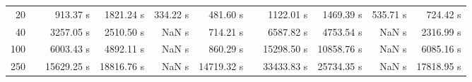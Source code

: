 {\begin{table}[h]
\begin{tabular}{rr rrrr r rrrr}
20 & & 913.37 s & 1821.24 s & 334.22 s & 481.60 s && 1122.01 s & 1469.39 s & 535.71 s & 724.42 s \\ 
40 & & 3257.05 s & 2510.50 s &  NaN s & 714.21 s && 6587.82 s & 4753.54 s &  NaN s & 2316.99 s \\ 
100 & & 6003.43 s & 4892.11 s &  NaN s & 860.29 s && 15298.50 s & 10858.76 s &  NaN s & 6085.16 s \\ 
250 & & 15629.25 s & 18816.76 s &  NaN s & 14719.32 s && 33433.83 s & 25734.35 s &  NaN s & 17818.95 s \\ 
\hline 
\end{tabular} 
\end{table} 
} 
